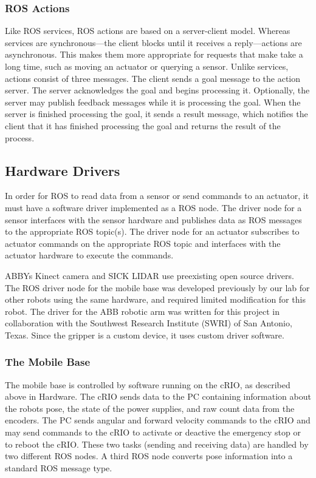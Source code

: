 \documentclass{article}
\begin{document}
\subsubsection{ROS Actions}
Like ROS services, ROS actions are based on a server-client model. Whereas services are synchronous---the client blocks until it receives a reply---actions are asynchronous. This makes them more appropriate for requests that make take a long time, such as moving an actuator or querying a sensor. Unlike services, actions consist of three messages. The client sends a goal message to the action server. The server acknowledges the goal and begins processing it. Optionally, the server may publish feedback messages while it is processing the goal. When the server is finished processing the goal, it sends a result message, which notifies the client that it has finished processing the goal and returns the result of the process. \cite{ros-actionlib}

\subsection{Hardware Drivers}
In order for ROS to read data from a sensor or send commands to an actuator, it must have a software driver implemented as a ROS node. The driver node for a sensor interfaces with the sensor hardware and publishes data as ROS messages to the appropriate ROS topic(s). The driver node for an actuator subscribes to actuator commands on the appropriate ROS topic and interfaces with the actuator hardware to execute the commands.

ABBY{\textquotesingle}s Kinect camera and SICK LIDAR use preexisting open source drivers. The ROS driver node for the mobile base was developed previously by our lab for other robots using the same hardware, and required limited modification for this robot.\cite{igvc-2010-harlie} The driver for the ABB robotic arm was written for this project in collaboration with the Southwest Research Institute (SWRI) of San Antonio, Texas. Since the gripper is a custom device, it uses custom driver software.

\subsubsection{The Mobile Base}
The mobile base is controlled by software running on the cRIO, as described above in Hardware. The cRIO sends data to the PC containing information about the robot{\textquotesingle}s pose, the state of the power supplies, and raw count data from the encoders. The PC sends angular and forward velocity commands to the cRIO and may send commands to the cRIO to activate or deactive the emergency stop or to reboot the cRIO. These two tasks (sending and receiving data) are handled by two different ROS nodes. A third ROS node converts pose information into a standard ROS message type.
\end{document}
